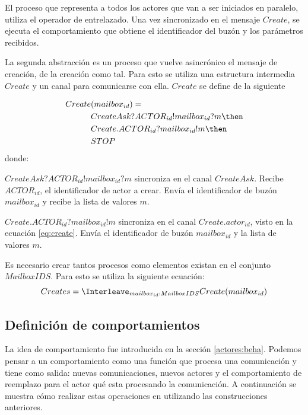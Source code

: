 
El proceso que representa a todos los actores que van a ser iniciados en paralelo, utiliza el operador de entrelazado. Una vez sincronizado en el mensaje $Create$, se ejecuta el comportamiento que obtiene el identificador del buzón y los parámetros recibidos. 

La segunda abstracción es un proceso que vuelve asincrónico el mensaje de creación, de la creación como tal. Para esto se utiliza una estructura intermedia $Create$ y un canal para comunicarse con ella. $Create$ se define de la siguiente 

\begin{equation}\label{eq:create}
\begin{split}
Create&(mailbox_{id}) = \\
&CreateAsk?ACTOR_{id}!mailbox_{id}?m \then \\
&Create.ACTOR_{id}?mailbox_{id}!m \then \\
&STOP
\end{split}
\end{equation}
donde:
\begin{description}
 \item $CreateAsk?ACTOR_{id}!mailbox_{id}?m$ sincroniza en el canal $CreateAsk$. Recibe $ACTOR_{id}$, el identificador de actor a crear. Envía el identificador de buzón $mailbox_{id}$ y recibe la lista de valores $m$.
 \item $Create.ACTOR_{id}?mailbox_{id}!m$ sincroniza en el canal $Create.actor_{id}$, visto en la ecuación \eqref{eq:create}. Envía el identificador de buzón $mailbox_{id}$ y la lista de valores $m$.

\end{description}
Es necesario crear tantos procesos como elementos existan en el conjunto $MailboxIDS$. Para esto se utiliza la siguiente ecuación:
\begin{equation}\label{eq:creates}
Creates = \Interleave_{mailbox_{id} : MailboxIDS} Create(mailbox_{id})
\end{equation}

\subsection{Definición de comportamientos}
La idea de comportamiento fue introducida en la sección \ref{actores:beha}. Podemos pensar a un comportamiento como una función que procesa una comunicación y tiene como salida: nuevas comunicaciones, nuevos actores y el comportamiento de reemplazo para el actor qué esta procesando la comunicación. A continuación se muestra cómo realizar estas operaciones en \CSP utilizando las construcciones anteriores.

